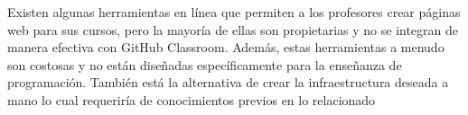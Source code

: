


Existen algunas herramientas en línea que permiten a los profesores crear páginas web para sus cursos, pero la mayoría de ellas son propietarias y no se integran de manera efectiva con GitHub Classroom. Además, estas herramientas a menudo son costosas y no están diseñadas específicamente para la enseñanza de programación. También está la alternativa de crear la infraestructura deseada a mano lo cual requeriría de conocimientos previos en lo relacionado

